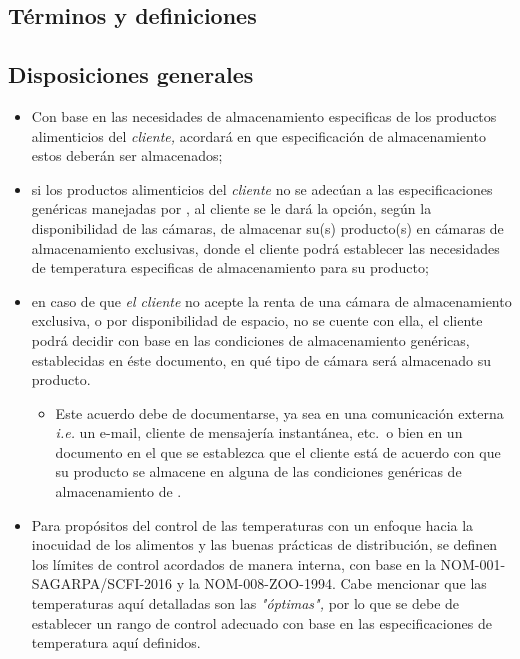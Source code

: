 \subsection{Términos y definiciones}

\begin{description}
\end{description}

\subsection{Disposiciones generales}

\begin{itemize}
	\item Con base en las necesidades de almacenamiento especificas de los productos alimenticios del \emph{cliente,}  acordará en que especificación de almacenamiento estos deberán ser almacenados;
	\item si los productos alimenticios del \emph{cliente} no se adecúan a las especificaciones genéricas manejadas por , al cliente se le dará la opción, según la disponibilidad de las cámaras, de almacenar su(s) producto(s) en cámaras de almacenamiento exclusivas, donde el cliente podrá establecer las necesidades de temperatura especificas de almacenamiento para su producto;
	\item en caso de que \emph{el cliente} no acepte la renta de una cámara de almacenamiento exclusiva, o por disponibilidad de espacio, no se cuente con ella, el cliente podrá decidir con base en las condiciones de almacenamiento genéricas, establecidas en éste documento, en qué tipo de cámara será almacenado su producto.
	\begin{itemize}
		\item Este acuerdo debe de documentarse, ya sea en una comunicación externa \emph{i.e.} un e-mail, cliente de mensajería instantánea, etc.\ o bien en un documento en el que se establezca que el cliente está de acuerdo con que su producto se almacene en alguna de las condiciones genéricas de almacenamiento de .
	\end{itemize}
	\item Para propósitos del control de las temperaturas con un enfoque hacia la inocuidad de los alimentos y las buenas prácticas de distribución, se definen los límites de control acordados de manera interna, con base en la NOM-001-SAGARPA/SCFI-2016 y la NOM-008-ZOO-1994. Cabe mencionar que las temperaturas aquí detalladas son las \emph{"óptimas",} por lo que se debe de establecer un rango de control adecuado con base en las especificaciones de temperatura aquí definidos.
\end{itemize}

